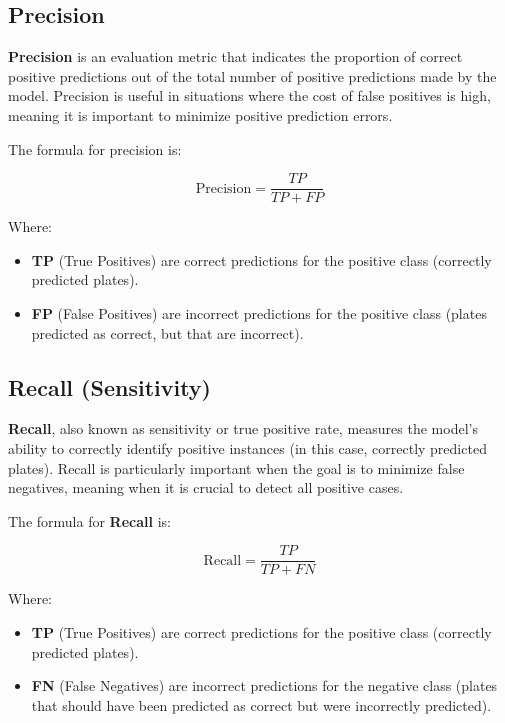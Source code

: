\documentclass[conference]{IEEEtran}
\begin{document}
	\subsection{Precision}
	
	\textbf{Precision} is an evaluation metric that indicates the proportion of correct positive predictions out of the total number of positive predictions made by the model. Precision is useful in situations where the cost of false positives is high, meaning it is important to minimize positive prediction errors.
	
	The formula for precision is:
	
	\[
	\text{Precision} = \frac{TP}{TP + FP}
	\]
	
	Where:
	
	\begin{itemize}
		\item \textbf{TP} (True Positives) are correct predictions for the positive class (correctly predicted plates).
		\item \textbf{FP} (False Positives) are incorrect predictions for the positive class (plates predicted as correct, but that are incorrect).
	\end{itemize}
	
	\subsection{Recall (Sensitivity)}
	
	\textbf{Recall}, also known as sensitivity or true positive rate, measures the model's ability to correctly identify positive instances (in this case, correctly predicted plates). Recall is particularly important when the goal is to minimize false negatives, meaning when it is crucial to detect all positive cases.
	
	The formula for \textbf{Recall} is:
	
	\[
	\text{Recall} = \frac{TP}{TP + FN}
	\]
	
	Where:
	
	\begin{itemize}
		\item \textbf{TP} (True Positives) are correct predictions for the positive class (correctly predicted plates).
		\item \textbf{FN} (False Negatives) are incorrect predictions for the negative class (plates that should have been predicted as correct but were incorrectly predicted).
	\end{itemize}
	
\end{document}
